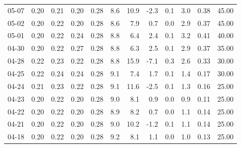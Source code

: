 \begin{threeparttable}
{\begin{tabular}{lrrrrrrrrrrr}
  05-07 &          0.20 &          0.21 &          0.20 &        0.28 &                 8.6 &                10.9 &       -2.3 &                 0.1 &              3.0 &            0.38 &                  45.00 \\
  05-02 &          0.20 &          0.22 &          0.20 &        0.28 &                 8.6 &                 7.9 &        0.7 &                 0.0 &              2.9 &            0.37 &                  45.00 \\
  05-01 &          0.20 &          0.22 &          0.24 &        0.28 &                 8.8 &                 6.4 &        2.4 &                 0.1 &              3.2 &            0.41 &                  40.00 \\
  04-30 &          0.20 &          0.22 &          0.27 &        0.28 &                 8.8 &                 6.3 &        2.5 &                 0.1 &              2.9 &            0.37 &                  35.00 \\
  04-28 &          0.22 &          0.23 &          0.22 &        0.28 &                 8.8 &                15.9 &       -7.1 &                 0.3 &              2.6 &            0.33 &                  30.00 \\
  04-25 &          0.22 &          0.24 &          0.24 &        0.28 &                 9.1 &                 7.4 &        1.7 &                 0.1 &              1.4 &            0.17 &                  30.00 \\
  04-24 &          0.21 &          0.23 &          0.22 &        0.28 &                 9.1 &                11.6 &       -2.5 &                 0.1 &              1.3 &            0.16 &                  25.00 \\
  04-23 &          0.20 &          0.22 &          0.20 &        0.28 &                 9.0 &                 8.1 &        0.9 &                 0.0 &              0.9 &            0.11 &                  25.00 \\
  04-22 &          0.20 &          0.22 &          0.20 &        0.28 &                 8.9 &                 8.2 &        0.7 &                 0.0 &              1.1 &            0.14 &                  25.00 \\
  04-21 &          0.20 &          0.22 &          0.20 &        0.28 &                 9.0 &                10.2 &       -1.2 &                 0.1 &              1.1 &            0.14 &                  25.00 \\
  04-18 &          0.20 &          0.22 &          0.20 &        0.28 &                 9.2 &                 8.1 &        1.1 &                 0.0 &              1.0 &            0.13 &                  25.00 \\

\end{tabular}}
\end{threeparttable}
